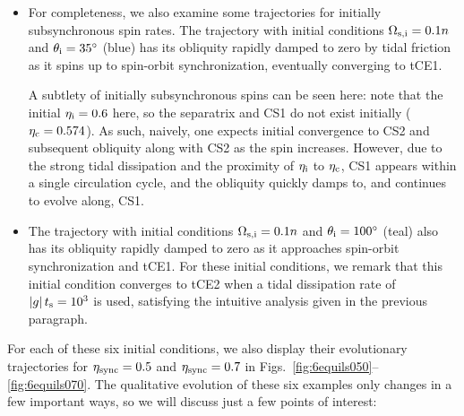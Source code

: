 \documentclass[
        fleqn,
        usenatbib,
        referee,
    ]{mnras}
\newcommand*{\abs}[1]{\left|#1\right|}
\begin{document}
\begin{itemize}
    \item For completeness, we also examine some trajectories for initially
        subsynchronous spin rates. The trajectory with initial conditions
        $\Omega_{\rm s, i} = 0.1n$ and $\theta_{\rm i} = 35^\circ$ (blue) has its
        obliquity rapidly damped to zero by tidal friction as it spins up to
        spin-orbit synchronization, eventually converging to tCE1.

        A subtlety of initially subsynchronous spins can be seen here: note that
        the initial $\eta_{\rm i} = 0.6$ here, so the separatrix and CS1 do not
        exist initially ($\eta_{\rm c} = 0.574$). As such, naively, one expects
        initial convergence to CS2 and subsequent obliquity along with CS2 as
        the spin increases. However, due to the strong tidal dissipation and the
        proximity of $\eta_{\rm i}$ to $\eta_{\rm c}$, CS1 appears within a
        single circulation cycle, and the obliquity quickly damps to, and
        continues to evolve along, CS1.

    \item The trajectory with initial conditions $\Omega_{\rm s, i} = 0.1n$ and
        $\theta_{\rm i} = 100^\circ$ (teal) also has its obliquity rapidly
        damped to zero as it approaches spin-orbit synchronization and tCE1. For
        these initial conditions, we remark that this initial condition
        converges to tCE2 when a tidal dissipation rate of $\abs{g}t_{\rm s} =
        10^3$ is used, satisfying the intuitive analysis given in the previous
        paragraph.
\end{itemize}
For each of these six initial conditions, we also display their evolutionary
trajectories for $\eta_{\rm sync} = 0.5$ and $\eta_{\rm sync} = 0.7$ in
Figs.~\ref{fig:6equils050}--\ref{fig:6equils070}. The qualitative evolution of
these six examples only changes in a few important ways, so we will discuss just
a few points of interest:
\end{document}
